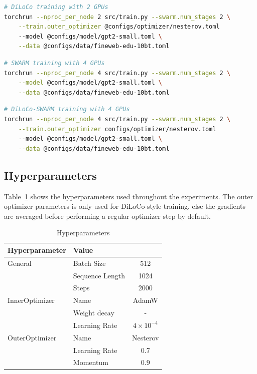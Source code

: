 \documentclass{article}
\begin{document}
\begin{lstlisting}[language=bash]
# DiLoCo training with 2 GPUs
torchrun --nproc_per_node 2 src/train.py --swarm.num_stages 2 \
    --train.outer_optimizer @configs/optimizer/nesterov.toml
    --model @configs/model/gpt2-small.toml \
    --data @configs/data/fineweb-edu-10bt.toml
\end{lstlisting}

\begin{lstlisting}[language=bash]
# SWARM training with 4 GPUs
torchrun --nproc_per_node 4 src/train.py --swarm.num_stages 2 \
    --model @configs/model/gpt2-small.toml \
    --data @configs/data/fineweb-edu-10bt.toml
\end{lstlisting}

\begin{lstlisting}[language=bash]
# DiLoCo-SWARM training with 4 GPUs
torchrun --nproc_per_node 4 src/train.py --swarm.num_stages 2 \
    --train.outer_optimizer configs/optimizer/nesterov.toml
    --model @configs/model/gpt2-small.toml \
    --data @configs/data/fineweb-edu-10bt.toml
\end{lstlisting}

\subsection{Hyperparameters}

Table~\ref{tab:hyperparameters} shows the hyperparameters used throughout the
experiments. The outer optimizer parameters is only used for DiLoCo-style
training, else the gradients are averaged before performing a regular optimizer
step by default.

\begin{table}[ht]
\centering
\begin{tabular}{llc}
\toprule
\textbf{Hyperparameter} & \textbf{Value} \\ 
\midrule
\multirow{1}{*}{General} & Batch Size & 512 \\ 
& Sequence Length & 1024 \\ 
& Steps & 2000 \\
\hline
\multirow{1}{*}{InnerOptimizer} & Name & AdamW \\ 
& Weight decay & - \\ 
& Learning Rate & $4 \times 10^{-4}$ \\ 
\hline
\multirow{1}{*}{OuterOptimizer} & Name & Nesterov \\ 
& Learning Rate & 0.7 \\ 
& Momentum & 0.9 \\ 
\bottomrule
\end{tabular}
\caption{Hyperparameters}
\label{tab:hyperparameters}
\end{table}
\end{document}

